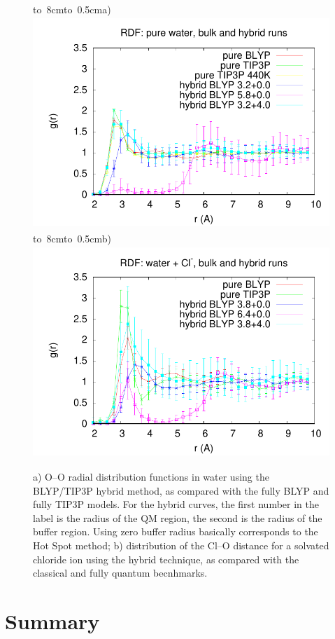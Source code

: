 \documentclass[11pt]{revtex4}
\begin{document}
\begin{figure}
\hbox{\vbox to 8cm{\hbox to 0.5cm{a)}\vfil}\includegraphics[height=8cm]{summary_pure_water_rdfs_G}}
\hbox{\vbox to 8cm{\hbox to 0.5cm{b)}\vfil}\includegraphics[height=8cm]{summary_water_Cl_rdfs_G}}
\caption{a) O--O radial distribution functions in water using the BLYP/TIP3P hybrid method, as compared with the fully BLYP and fully TIP3P models. For the hybrid curves, the first number in the label is the radius of the QM region, the second is the radius of the buffer region. Using zero buffer radius basically corresponds to the Hot Spot method; b) distribution of the Cl--O distance for a solvated chloride ion using the hybrid technique, as compared with the classical and fully quantum becnhmarks. }
\label{water_blyp_rdf}
\end{figure}
\section{Summary}


\end{document}
